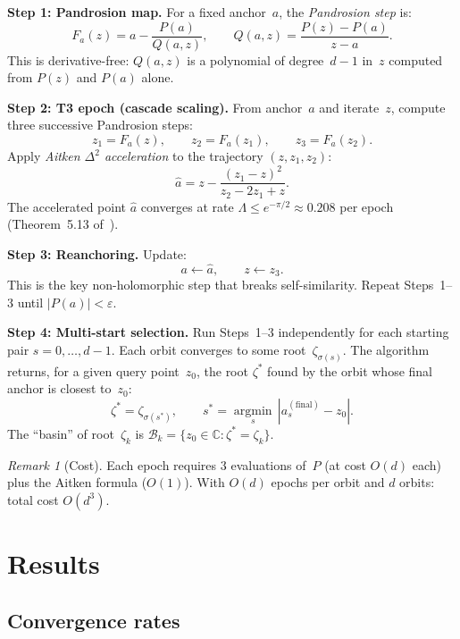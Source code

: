 \documentclass[10pt,a4paper,oneside]{book}
\theoremstyle{definition}
\theoremstyle{remark}
\newtheorem{remark}[theorem]{Remark}
\begin{document}
\medskip
\noindent\textbf{Step 1: Pandrosion map.}  For a fixed anchor~$a$, the \emph{Pandrosion step} is:
\[
  F_a(z) = a - \frac{P(a)}{Q(a, z)}, \qquad
  Q(a, z) = \frac{P(z) - P(a)}{z - a}.
\]
This is derivative-free: $Q(a, z)$ is a polynomial of degree~$d-1$ in~$z$ computed from $P(z)$ and $P(a)$ alone.

\medskip
\noindent\textbf{Step 2: T3 epoch (cascade scaling).}  From anchor~$a$ and iterate~$z$, compute three successive Pandrosion steps:
\[
  z_1 = F_a(z), \qquad z_2 = F_a(z_1), \qquad z_3 = F_a(z_2).
\]
Apply \emph{Aitken $\Delta^2$ acceleration} to the trajectory $(z, z_1, z_2)$:
\[
  \hat{a} = z - \frac{(z_1 - z)^2}{z_2 - 2z_1 + z}.
\]
The accelerated point $\hat{a}$ converges at rate $\Lambda \leq e^{-\pi/2} \approx 0.208$ per epoch (Theorem~5.13 of~\cite{Besevic2026g}).

\medskip
\noindent\textbf{Step 3: Reanchoring.}  Update:
\[
  a \leftarrow \hat{a}, \qquad z \leftarrow z_3.
\]
This is the key non-holomorphic step that breaks self-similarity.  Repeat Steps~1--3 until $|P(a)| < \varepsilon$.

\medskip
\noindent\textbf{Step 4: Multi-start selection.}  Run Steps~1--3 independently for each starting pair $s = 0, \ldots, d-1$.  Each orbit converges to some root~$\zeta_{\sigma(s)}$.  The algorithm returns, for a given query point~$z_0$, the root $\zeta^*$ found by the orbit whose final anchor is closest to~$z_0$:
\[
  \zeta^* = \zeta_{\sigma(s^*)}, \qquad
  s^* = \operatorname*{argmin}_{s}\, |a_s^{(\text{final})} - z_0|.
\]
The ``basin'' of root~$\zeta_k$ is $\mathcal{B}_k = \{z_0 \in \mathbb{C} : \zeta^* = \zeta_k\}$.

\begin{remark}[Cost]
Each epoch requires $3$ evaluations of~$P$ (at cost $O(d)$ each) plus the Aitken formula ($O(1)$).  With $O(d)$ epochs per orbit and $d$ orbits: total cost $O(d^3)$.
\end{remark}

\section{Results}
\label{sec:results}

\subsection{Convergence rates}
\end{document}
